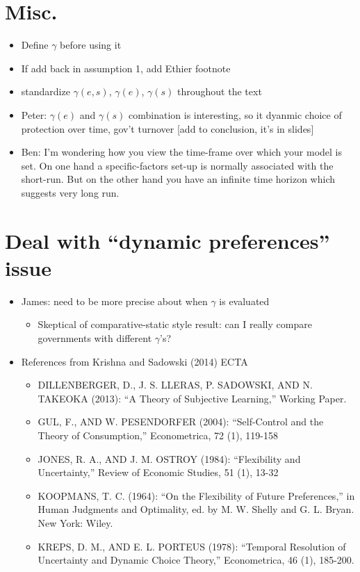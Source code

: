 \documentclass[12pt]{article}
\newcommand{\ga}{\gamma}
\begin{document}
\section{Misc.}
\begin{itemize}
	\item Define $\ga$ before using it
	\item If add back in assumption 1, add Ethier footnote
	\item standardize $\ga(e,s)$, $\ga(e)$, $\ga(s)$ throughout the text
	\item Peter: $\ga(e)$ and $\ga(s)$ combination is interesting, so it dyanmic choice of protection over time, gov't turnover [add to conclusion, it's in slides]
	\item Ben: I'm wondering how you view the time-frame over which your model is set.  On one hand a specific-factors set-up is normally associated with the short-run.  But on the other hand you have an infinite time horizon which suggests very long run.

\end{itemize}

\section{Deal with ``dynamic preferences'' issue}
	\begin{itemize}
		\item James: need to be more precise about when $\ga$ is evaluated
			\begin{itemize}
				\item Skeptical of comparative-static style result: can I really compare governments with different $\ga$'s?
			\end{itemize}
		\item References from Krishna and Sadowski (2014) ECTA
				\begin{itemize}
					\item DILLENBERGER, D., J. S. LLERAS, P. SADOWSKI, AND N. TAKEOKA (2013): ``A Theory of Subjective Learning,'' Working Paper. 
					\item GUL, F., AND W. PESENDORFER (2004): ``Self-Control and the Theory of Consumption,'' Econometrica, 72 (1), 119-158
					\item JONES, R. A., AND J. M. OSTROY (1984): ``Flexibility and Uncertainty,'' Review of Economic Studies, 51 (1), 13-32
					\item KOOPMANS, T. C. (1964): ``On the Flexibility of Future Preferences,'' in Human Judgments and Optimality, ed. by M. W. Shelly and G. L. Bryan. New York: Wiley.
					\item KREPS, D. M., AND E. L. PORTEUS (1978): ``Temporal Resolution of Uncertainty and Dynamic Choice Theory,'' Econometrica, 46 (1), 185-200.
				\end{itemize}
		\end{itemize}
\end{document}
